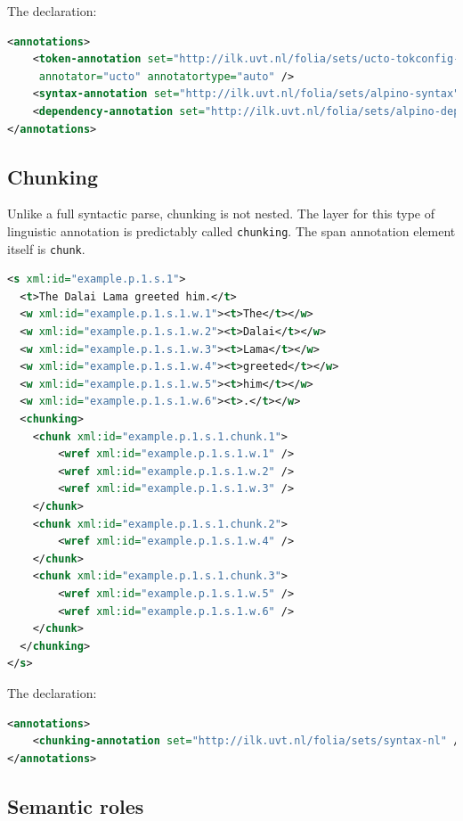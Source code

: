\documentclass[a4paper,12pt]{report}
\begin{document}
The declaration:

\begin{lstlisting}[language=xml]
<annotations>
    <token-annotation set="http://ilk.uvt.nl/folia/sets/ucto-tokconfig-nl" 
     annotator="ucto" annotatortype="auto" />
    <syntax-annotation set="http://ilk.uvt.nl/folia/sets/alpino-syntax" /> 
    <dependency-annotation set="http://ilk.uvt.nl/folia/sets/alpino-dep" />
</annotations>
\end{lstlisting}

\subsection{Chunking}

Unlike a full syntactic parse, chunking is not nested. The layer for this type of linguistic annotation is predictably called \texttt{chunking}. The span annotation element itself is \texttt{chunk}.

\begin{lstlisting}[language=xml]
<s xml:id="example.p.1.s.1">
  <t>The Dalai Lama greeted him.</t>
  <w xml:id="example.p.1.s.1.w.1"><t>The</t></w>
  <w xml:id="example.p.1.s.1.w.2"><t>Dalai</t></w>
  <w xml:id="example.p.1.s.1.w.3"><t>Lama</t></w>
  <w xml:id="example.p.1.s.1.w.4"><t>greeted</t></w>
  <w xml:id="example.p.1.s.1.w.5"><t>him</t></w>
  <w xml:id="example.p.1.s.1.w.6"><t>.</t></w>
  <chunking>
    <chunk xml:id="example.p.1.s.1.chunk.1">       
        <wref xml:id="example.p.1.s.1.w.1" />       
        <wref xml:id="example.p.1.s.1.w.2" />       
        <wref xml:id="example.p.1.s.1.w.3" />        
    </chunk>
    <chunk xml:id="example.p.1.s.1.chunk.2">       
        <wref xml:id="example.p.1.s.1.w.4" />
    </chunk>
    <chunk xml:id="example.p.1.s.1.chunk.3">       
        <wref xml:id="example.p.1.s.1.w.5" />
        <wref xml:id="example.p.1.s.1.w.6" />
    </chunk>    
  </chunking>
</s>
\end{lstlisting}


The declaration:

\begin{lstlisting}[language=xml]
<annotations>
    <chunking-annotation set="http://ilk.uvt.nl/folia/sets/syntax-nl" />
</annotations>
\end{lstlisting}



\subsection{Semantic roles}
\end{document}

